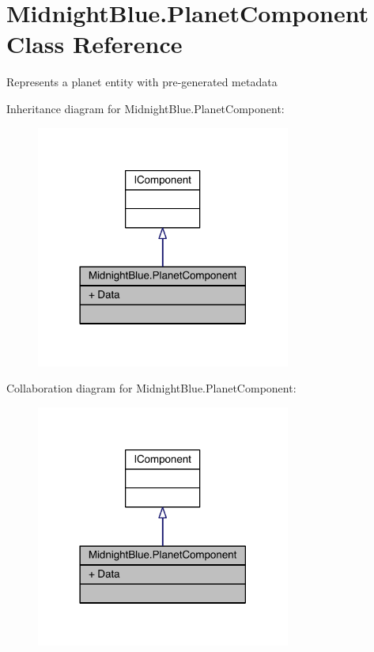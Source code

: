 \hypertarget{class_midnight_blue_1_1_planet_component}{}\section{Midnight\+Blue.\+Planet\+Component Class Reference}
\label{class_midnight_blue_1_1_planet_component}


Represents a planet entity with pre-\/generated metadata  




Inheritance diagram for Midnight\+Blue.\+Planet\+Component\+:\nopagebreak
\begin{figure}[H]
\begin{center}
\leavevmode
\includegraphics[width=237pt]{class_midnight_blue_1_1_planet_component__inherit__graph}
\end{center}
\end{figure}


Collaboration diagram for Midnight\+Blue.\+Planet\+Component\+:\nopagebreak
\begin{figure}[H]
\begin{center}
\leavevmode
\includegraphics[width=237pt]{class_midnight_blue_1_1_planet_component__coll__graph}
\end{center}
\end{figure}
